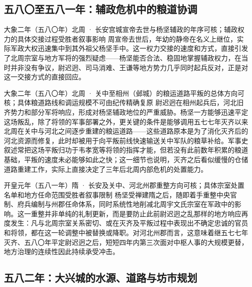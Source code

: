 \subsection{五八〇至五八一年：辅政危机中的粮道协调}

\begin{event}{}{大象二年（五八〇年）}{北周 · 长安宫城}{宣帝去世与杨坚辅政的年序可核；辅政权力的具体交接过程受胜者叙事影响}
周宣帝去世后，年幼的静帝在名义上继位，实际军政大权迅速集中到其外祖父杨坚手中。这一权力交接的速度和方式，直接引发了北周宗室与地方军将的强烈疑虑——杨坚能否合法、稳固地掌握辅政权力，在当时并非没有争议，尉迟迥、司马消难、王谦等地方势力几乎同时起兵反对，正是对这一交接方式的直接回应。
\end{event}

\begin{event}{}{大象二年（五八〇年）}{北周 · 关中至相州（邺城）的粮运道路}{平叛的总体方向可核；具体粮道路线和调运规模不可由纪传精确复原}
尉迟迥在相州起兵后，河北旧齐势力和部分军将响应，形成对杨坚辅政地位的严重威胁。杨坚一方能够迅速平定这场叛乱，除了将领的军事部署之外，更关键的条件是能够调用五七七年灭齐以来北周在关中与河北之间逐步重建的粮运道路——这些道路原本是为了消化灭齐后的河北资源而修复，此时却被用于向平叛前线快速输送关中军队的粮草补给。军事史叙述常把这场平叛归功于韦孝宽等将领的指挥才能，但若没有此前数年积累的粮道基础，平叛的速度未必能够如此之快；这一细节也说明，灭齐之后看似缓慢的仓储道路重建工作，实际上直接决定了三年后北周内部危机的处置能力。
\end{event}

\begin{event}{}{开皇元年（五八一年）}{隋 · 长安及关中、河北州郡}{重整方向可核；具体宗室处置名单和地方任命范围受胜者叙事限制}
杨坚受禅建隋之后，随即着手重整中央官制、府兵编制与州郡任命体系，同时系统性地削减北周宇文氏宗室在军政中的影响。这一重整并非单纯的礼制更新，而是要防止此前尉迟迥之乱那样的地方响应再度发生：凡与北周宗室关系密切、或在灭齐及平叛过程中表现出不确定忠诚的官员和将领，都在这一轮调整中被替换或降职。对河北州郡而言，这意味着继五七七年灭齐、五八〇年平定尉迟迥之后，短短四年内第三次面对中枢人事的大规模更替，地方治理的连续性因此持续承受冲击。
\end{event}

\subsection{五八二年：大兴城的水源、道路与坊市规划}

